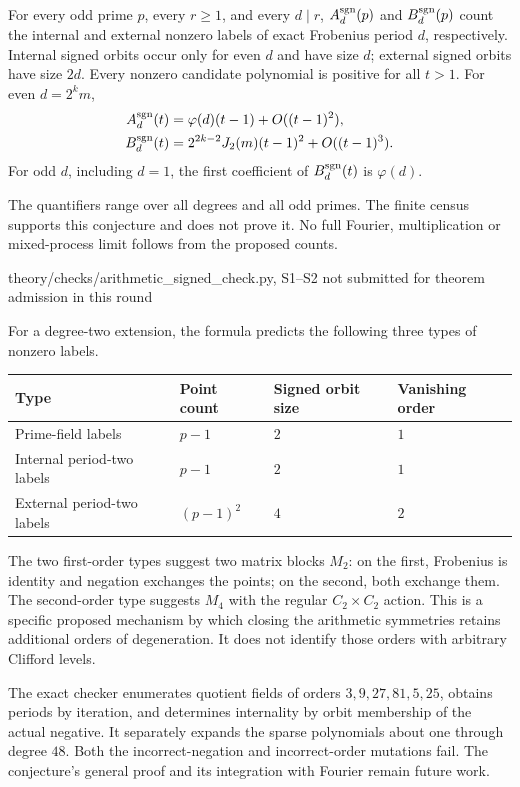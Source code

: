 \begin{conjecture}
\statusConjecture\quad
For every odd prime $p$, every $r\geq1$, and every $d\mid r$,
$A_d^{\rm sgn}(p)$ and $B_d^{\rm sgn}(p)$ count the internal and
external nonzero labels of exact Frobenius period $d$, respectively.
Internal signed orbits occur only for even $d$ and have size $d$;
external signed orbits have size $2d$. Every nonzero candidate polynomial
is positive for all $t>1$. For even $d=2^k m$,
\begin{align*}
 A_d^{\rm sgn}(t)&=\varphi(d)(t-1)+O((t-1)^2),\\
 B_d^{\rm sgn}(t)&=2^{2k-2}J_2(m)(t-1)^2+O((t-1)^3).
\end{align*}
For odd $d$, including $d=1$, the first coefficient of
$B_d^{\rm sgn}(t)$ is $\varphi(d)$.
\end{conjecture}
\begin{scope}
The quantifiers range over all degrees and all odd primes. The finite
census supports this conjecture and does not prove it. No full Fourier,
multiplication or mixed-process limit follows from the proposed counts.
\end{scope}
{theory/checks/arithmetic\_signed\_check.py, S1--S2}
{not submitted for theorem admission in this round}

For a degree-two extension, the formula predicts the following three
types of nonzero labels.
\begin{center}
\begin{tabular}{llll}
\toprule
Type & Point count & Signed orbit size & Vanishing order\\
\midrule
Prime-field labels & $p-1$ & $2$ & $1$\\
Internal period-two labels & $p-1$ & $2$ & $1$\\
External period-two labels & $(p-1)^2$ & $4$ & $2$\\
\bottomrule
\end{tabular}
\end{center}
The two first-order types suggest two matrix blocks $M_2$: on the first,
Frobenius is identity and negation exchanges the points; on the second,
both exchange them. The second-order type suggests $M_4$ with the regular
$C_2\times C_2$ action. This is a specific proposed mechanism by which
closing the arithmetic symmetries retains additional orders of degeneration.
It does not identify those orders with arbitrary Clifford levels.

The exact checker enumerates quotient fields of orders $3,9,27,81,5,25$,
obtains periods by iteration, and determines internality by orbit membership
of the actual negative. It separately expands the sparse polynomials about
one through degree $48$. Both the incorrect-negation and incorrect-order
mutations fail. The conjecture's general proof and its integration with
Fourier remain future work.
